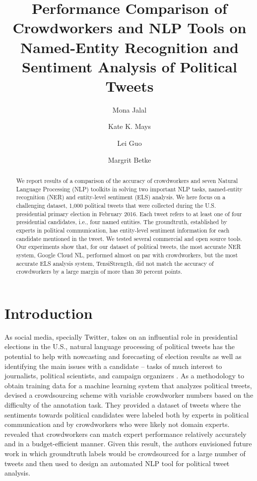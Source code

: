 \documentclass[11pt,a4paper]{article}
\title{Performance Comparison of Crowdworkers and NLP Tools on Named-Entity Recognition and Sentiment Analysis of Political Tweets}
\author[*]{Mona Jalal}
\author[**]{Kate K. Mays}
\author[**]{Lei Guo}
\author[*]{Margrit Betke}
\affil[*]{Department of Computer Science, Boston University}
\affil[**]{Division of Emerging Media Studies, Boston University}
\begin{document}
\maketitle
\begin{abstract}

We report results of a comparison of the accuracy of crowdworkers and seven Natural Language Processing (NLP) toolkits in solving two important NLP tasks,  named-entity recognition (NER) and entity-level sentiment (ELS) analysis.  We here focus on a challenging dataset, 1,000 political tweets that were collected during the U.S. presidential primary election in February 2016.  Each tweet refers to at least one of four presidential candidates, i.e., four named entities.  The groundtruth, established by experts in political communication, has entity-level sentiment information for each candidate mentioned in the tweet.  We tested several commercial and open source tools.  Our experiments show that, for our dataset of political tweets, the most accurate NER system, Google Cloud NL, performed almost on par with crowdworkers, but the most accurate ELS analysis system, TensiStrength, did not match the accuracy of crowdworkers by a large margin of more than 30 percent points.
\end{abstract}

\section{Introduction}
As social media, specially Twitter, takes on an influential role in presidential elections in the U.S., natural language processing of political tweets 
\citep{MohammadZhKiMa15}
has the potential to help with nowcasting and forecasting of election results as well as identifying the main issues with a candidate -- tasks of much interest to journalists, political scientists, and campaign organizers \citep{FarzindarIn15}. As a methodology to obtain training data for a machine learning system that analyzes political tweets, 
\citet{SamekiGeMaGuBe16} devised a crowdsourcing scheme with variable crowdworker numbers based on the difficulty of the annotation task. They provided a dataset of tweets where the sentiments towards political candidates were labeled both by experts in political communication and by crowdworkers who were likely not domain experts. \citet{SamekiGeMaGuBe16} revealed that crowdworkers can match expert performance relatively accurately and in a budget-efficient manner.  Given this result, the authors envisioned future work in which groundtruth labels would be crowdsourced for a large number of tweets and then used to design an automated NLP tool for political tweet analysis. 
\end{document}
